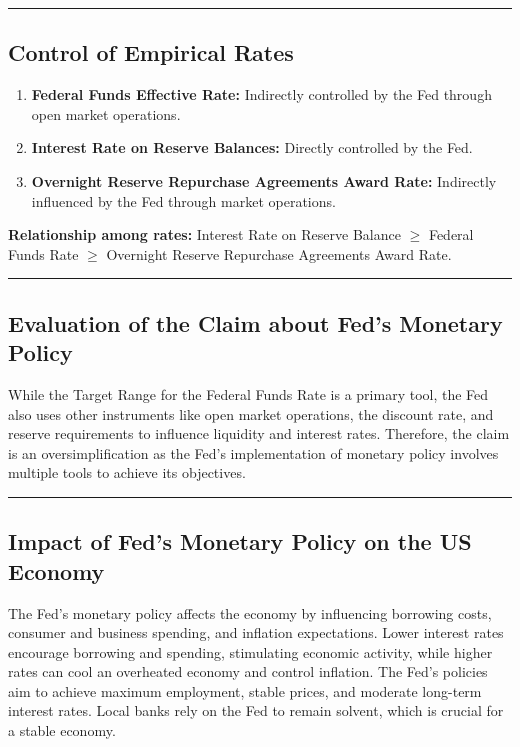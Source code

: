 \documentclass{article}
\begin{document}
\noindent\rule{\linewidth}{0.5pt}

\subsection{Control of Empirical Rates}
\begin{enumerate}
    \item \textbf{Federal Funds Effective Rate:} Indirectly controlled by the Fed through open market operations.
    \item \textbf{Interest Rate on Reserve Balances:} Directly controlled by the Fed.
    \item \textbf{Overnight Reserve Repurchase Agreements Award Rate:} Indirectly influenced by the Fed through market operations.
\end{enumerate}

\textbf{Relationship among rates:} Interest Rate on Reserve Balance \(\geq\) Federal Funds Rate \(\geq\) Overnight Reserve Repurchase Agreements Award Rate.

\noindent\rule{\linewidth}{0.5pt}

\subsection{Evaluation of the Claim about Fed's Monetary Policy}
While the Target Range for the Federal Funds Rate is a primary tool, the Fed also uses other instruments like open market operations, the discount rate, and reserve requirements to influence liquidity and interest rates. Therefore, the claim is an oversimplification as the Fed's implementation of monetary policy involves multiple tools to achieve its objectives.

\noindent\rule{\linewidth}{0.5pt}

\subsection{Impact of Fed’s Monetary Policy on the US Economy}
The Fed's monetary policy affects the economy by influencing borrowing costs, consumer and business spending, and inflation expectations. Lower interest rates encourage borrowing and spending, stimulating economic activity, while higher rates can cool an overheated economy and control inflation. The Fed's policies aim to achieve maximum employment, stable prices, and moderate long-term interest rates. Local banks rely on the Fed to remain solvent, which is crucial for a stable economy.
\end{document}
